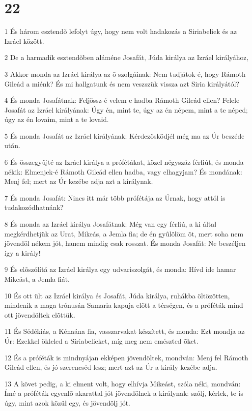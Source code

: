 \chapter{22}

\par 1 És három esztendõ lefolyt úgy, hogy nem volt hadakozás a Siriabeliek és az Izráel között.
\par 2 De a harmadik esztendõben aláméne Josafát, Júda királya az Izráel királyához,
\par 3 Akkor monda az Izráel királya az õ szolgáinak: Nem tudjátok-é, hogy Rámoth Gileád a miénk? És mi hallgatunk és nem veszszük vissza azt Siria királyától?
\par 4 És monda Josafátnak: Feljössz-é velem e hadba Rámoth Gileád ellen? Felele Josafát az Izráel királyának: Úgy én, mint te, úgy az én népem, mint a te néped; úgy az én lovaim, mint a te lovaid.
\par 5 És monda Josafát az Izráel királyának: Kérdezõsködjél még ma az Úr beszéde után.
\par 6 És összegyûjté az Izráel királya a prófétákat, közel négyszáz férfiút, és monda nékik: Elmenjek-é Rámoth Gileád ellen hadba, vagy elhagyjam? És mondának: Menj fel; mert az Úr kezébe adja azt a királynak.
\par 7 És monda Josafát: Nincs itt már több prófétája az Úrnak, hogy attól is tudakozódhatnánk?
\par 8 És monda az Izráel királya Josafátnak: Még van egy férfiú, a ki által megkérdhetjük az Urat, Mikeás, a Jemla fia; de én gyûlölöm õt, mert soha nem jövendöl nékem jót, hanem mindig csak rosszat. És monda Josafát: Ne beszéljen így a király!
\par 9 És elõszólítá az Izráel királya egy udvariszolgát, és monda: Hívd ide hamar Mikeást, a Jemla fiát.
\par 10 És ott ült az Izráel királya és Josafát, Júda királya, ruhákba öltözötten, mindenik a maga trónusán Samaria kapuja elõtt a térségen, és a próféták mind ott jövendöltek elõttük.
\par 11 És Sédékiás, a Kénaána fia, vasszarvakat készített, és monda: Ezt mondja az Úr: Ezekkel ökleled a Siriabelieket, míg meg nem emészted õket.
\par 12 És a próféták is mindnyájan ekképen jövendöltek, mondván: Menj fel Rámoth Gileád ellen, és jó szerencséd lesz; mert azt az Úr a király kezébe adja.
\par 13 A követ pedig, a ki elment volt, hogy elhívja Mikeást, szóla néki, mondván: Ímé a próféták egyenlõ akarattal jót jövendölnek a királynak: szólj, kérlek, te is úgy, mint azok közül egy, és jövendölj jót.
